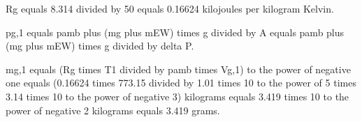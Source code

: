 Rg equals 8.314 divided by 50 equals 0.16624 kilojoules per kilogram Kelvin.  

pg,1 equals pamb plus (mg plus mEW) times g divided by A equals pamb plus (mg plus mEW) times g divided by delta P.  

mg,1 equals (Rg times T1 divided by pamb times Vg,1) to the power of negative one equals (0.16624 times 773.15 divided by 1.01 times 10 to the power of 5 times 3.14 times 10 to the power of negative 3) kilograms equals 3.419 times 10 to the power of negative 2 kilograms equals 3.419 grams.
